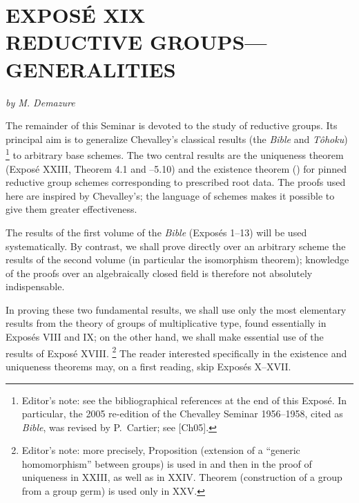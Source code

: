 

\chapter*{EXPOSÉ XIX\\[0.4em]
REDUCTIVE GROUPS---GENERALITIES}

\begin{center}
\textit{by M. Demazure}
\end{center}

\begingroup
\renewcommand{\thefootnote}{0}%
%
\endgroup

The remainder of this Seminar is devoted to the study of reductive groups.  Its
principal aim is to generalize Chevalley's classical results (the
\emph{Bible} and \emph{Tôhoku})%
\footnote{Editor's note: see the bibliographical references at the end of this
Exposé.  In particular, the 2005 re-edition of the Chevalley Seminar
1956--1958, cited as \emph{Bible}, was revised by P.\ Cartier; see [Ch05].}
to arbitrary base schemes.  The two central results are the uniqueness theorem
(Exposé XXIII, Theorem 4.1 and --5.10) and the existence theorem
() for pinned reductive group schemes corresponding to
prescribed root data.  The proofs used here are inspired by Chevalley's; the
language of schemes makes it possible to give them greater effectiveness.

The results of the first volume of the \emph{Bible} (Exposés 1--13) will be
used systematically.  By contrast, we shall prove directly over an arbitrary
scheme the results of the second volume (in particular the isomorphism
theorem); knowledge of the proofs over an algebraically closed field is
therefore not absolutely indispensable.

In proving these two fundamental results, we shall use only the most elementary
results from the theory of groups of multiplicative type, found essentially in
Exposés VIII and IX; on the other hand, we shall make essential use of the
results of Exposé XVIII.%
\footnote{Editor's note: more precisely, Proposition  (extension of a
``generic homomorphism'' between groups) is used in  and then in the
proof of uniqueness in XXIII, as well as in XXIV.  Theorem 
(construction of a group from a group germ) is used only in XXV.}
The reader interested specifically in the existence and uniqueness theorems
may, on a first reading, skip Exposés X--XVII.

